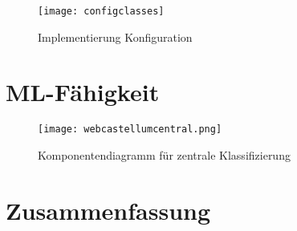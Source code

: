 \begin{figure}[h]
  \begin{center}
    \texttt{[image: configclasses]}
    \caption{Implementierung Konfiguration}
    \label{fig.impkonfig}
  \end{center}
\end{figure}



\section{ML-Fähigkeit}

\begin{figure}[h]
    \centering
    \texttt{[image: webcastellumcentral.png]}
    \caption{Komponentendiagramm für zentrale Klassifizierung}
    \label{fig:my_future}
\end{figure}



\section{Zusammenfassung}

